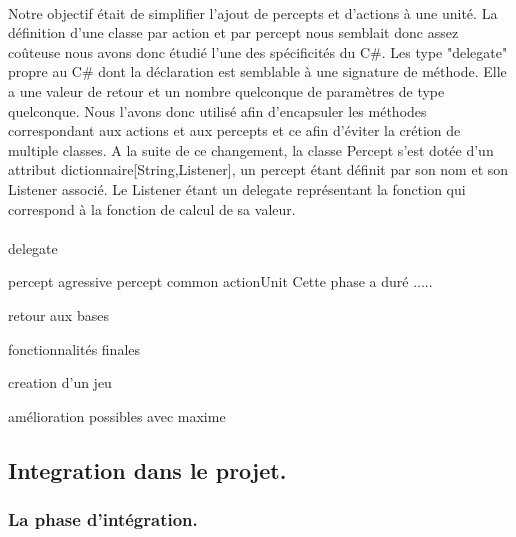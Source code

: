 \documentclass{report}
\begin{document}
\paragraph{}
Notre objectif était de simplifier l'ajout de percepts et d'actions à une unité. La définition d'une classe par action et par percept nous semblait donc assez coûteuse nous avons donc étudié l'une des spécificités du C\#. Les type "delegate" propre au C\# dont la déclaration est semblable à  une signature de méthode. Elle a une valeur de retour et un nombre quelconque de paramètres de type quelconque.
Nous l'avons donc utilisé afin d'encapsuler les méthodes correspondant aux actions et aux percepts et ce afin d'éviter la crétion de multiple classes.
A la suite de ce changement, la classe Percept s'est dotée d'un attribut dictionnaire[String,Listener], un percept étant définit par son nom et son Listener associé. Le Listener étant un delegate représentant la fonction qui correspond à la fonction de calcul de sa valeur.


\paragraph{}
\paragraph{}
\paragraph{}
\paragraph{}
\paragraph{}
delegate

percept agressive percept common actionUnit
Cette phase a duré .....

retour aux bases

fonctionnalités finales
 
creation d'un jeu

amélioration possibles avec maxime 

\subsection{Integration dans le projet.}

\subsubsection{La phase d'intégration.}
\end{document}
